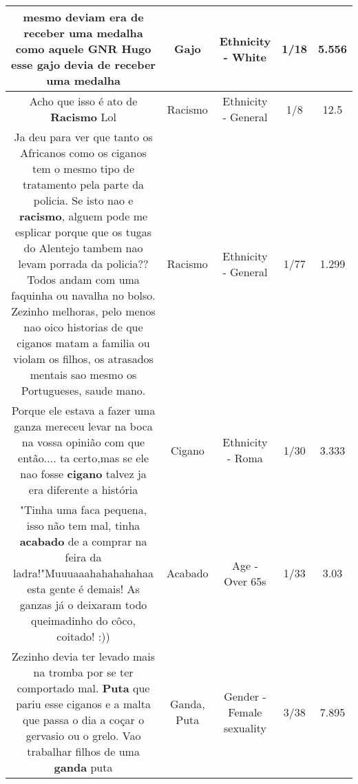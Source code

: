 \documentclass[11pt]{article}
\newlength\mylength
\begin{document}
\begin{center}
\begin{longtable}{|C{.65\mylength}|C{.30\mylength}|C{.12\mylength}|C{.12\mylength}|C{.12\mylength}|}
  \small mesmo deviam era de receber uma medalha como aquele GNR Hugo esse \textbf{gajo} devia de receber uma medalha\normalsize   & Gajo & Ethnicity - White & 1/18 & 5.556 \\  \hline
  \small Acho que isso é ato de \textbf{Racismo} Lol\normalsize   & Racismo & Ethnicity - General & 1/8 & 12.5 \\  \hline
  \small Ja deu para ver que tanto os Africanos como os ciganos tem o mesmo tipo de tratamento pela parte da policia. Se isto nao e \textbf{racismo}, alguem pode me esplicar porque que os tugas do Alentejo tambem nao levam porrada da policia?? Todos andam com uma faquinha ou navalha no bolso. Zezinho melhoras, pelo menos nao oico historias de que ciganos matam a familia ou violam os filhos, os atrasados mentais sao mesmo os Portugueses, saude mano.\normalsize   & Racismo & Ethnicity - General & 1/77 & 1.299 \\  \hline
  \small Porque ele estava a fazer uma ganza mereceu levar na boca na vossa opinião  com que então.... ta certo,mas se ele nao fosse \textbf{cigano} talvez ja era diferente a história\normalsize   & Cigano & Ethnicity - Roma & 1/30 & 3.333 \\  \hline
  \small "Tinha uma faca pequena, isso não tem mal, tinha \textbf{acabado} de a comprar na feira da ladra!"Muuuaaahahahahahaa esta gente é demais! As ganzas já o deixaram todo queimadinho do côco, coitado! :))\normalsize   & Acabado & Age - Over 65s & 1/33 & 3.03 \\  \hline
  \small Zezinho devia ter levado mais na tromba por se ter comportado mal. \textbf{Puta} que pariu esse ciganos e a malta que passa o dia a coçar o gervasio ou o grelo. Vao trabalhar filhos de uma \textbf{ganda} puta\normalsize   & Ganda, Puta & Gender - Female sexuality & 3/38 & 7.895 \\  \hline

\end{longtable}
\end{center}
\end{document}
